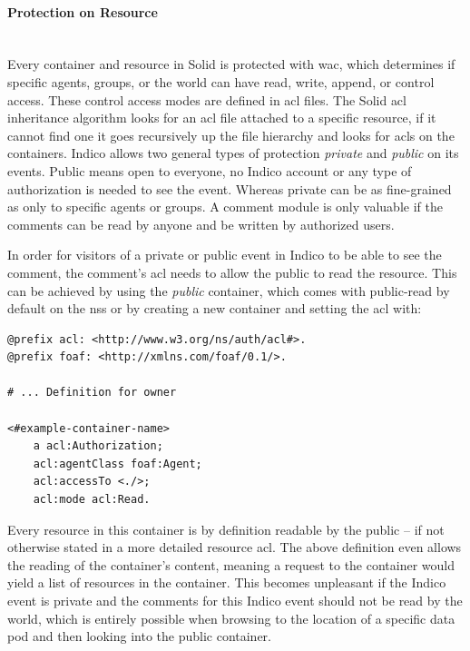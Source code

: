 \vspace{0.5cm}
\paragraph{Protection on Resource}\label{protection-on-resource}\mbox{}\\

Every container and resource in Solid is protected with \gls{wac}, which determines if specific agents, groups, or the world can have read, write, append, or control access. These control access modes are defined in \gls{acl} files. The Solid \gls{acl} inheritance algorithm looks for an \gls{acl} file attached to a specific resource, if it cannot find one it goes recursively up the file hierarchy and looks for \glspl{acl} on the containers.
Indico allows two general types of protection \textit{private} and \textit{public} on its events. Public means open to everyone, no Indico account or any type of authorization is needed to see the event. Whereas private can be as fine-grained as only to specific agents or groups. A comment module is only valuable if the comments can be read by anyone and be written by authorized users.

In order for visitors of a private or public event in Indico to be able to see the comment, the comment’s \gls{acl} needs to allow the public to read the resource. This can be achieved by using the \textit{public} container, which comes with public-read by default on the \gls{nss} or by creating a new container and setting the \gls{acl} with:

\begin{lstlisting}[language=Other,columns=fullflexible, caption={Setting default read for resources in container}, label={lst:container-acl}]
@prefix acl: <http://www.w3.org/ns/auth/acl#>.
@prefix foaf: <http://xmlns.com/foaf/0.1/>.

# ... Definition for owner

<#example-container-name>
    a acl:Authorization;
    acl:agentClass foaf:Agent;
    acl:accessTo <./>;
    acl:mode acl:Read.
\end{lstlisting}

Every resource in this container is by definition readable by the public -- if not otherwise stated in a more detailed resource \gls{acl}. The above definition even allows the reading of the container’s content, meaning a request to the container would yield a list of resources in the container. This becomes unpleasant if the Indico event is private and the comments for this Indico event should not be read by the world, which is entirely possible when browsing to the location of a specific data pod and then looking into the public container.

